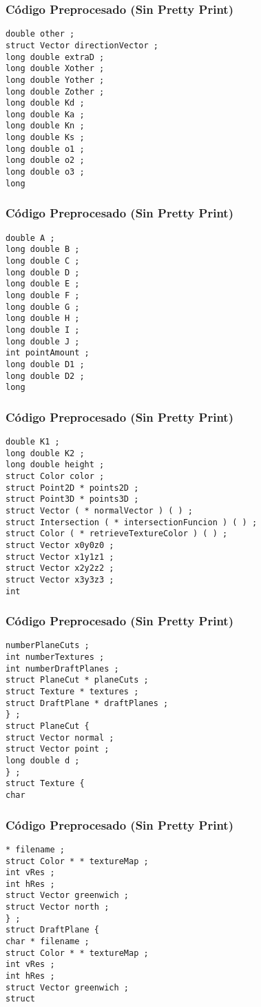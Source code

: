 \documentclass{beamer}
\begin{document}
\begin{frame}[fragile]
\frametitle{C\'odigo Preprocesado (Sin Pretty Print)}
\begin{lstlisting}[style=CStyle]
double other ; 
struct Vector directionVector ; 
long double extraD ; 
long double Xother ; 
long double Yother ; 
long double Zother ; 
long double Kd ; 
long double Ka ; 
long double Kn ; 
long double Ks ; 
long double o1 ; 
long double o2 ; 
long double o3 ; 
long \end{lstlisting}
\end{frame}
\begin{frame}[fragile]
\frametitle{C\'odigo Preprocesado (Sin Pretty Print)}
\begin{lstlisting}[style=CStyle]
double A ; 
long double B ; 
long double C ; 
long double D ; 
long double E ; 
long double F ; 
long double G ; 
long double H ; 
long double I ; 
long double J ; 
int pointAmount ; 
long double D1 ; 
long double D2 ; 
long \end{lstlisting}
\end{frame}
\begin{frame}[fragile]
\frametitle{C\'odigo Preprocesado (Sin Pretty Print)}
\begin{lstlisting}[style=CStyle]
double K1 ; 
long double K2 ; 
long double height ; 
struct Color color ; 
struct Point2D * points2D ; 
struct Point3D * points3D ; 
struct Vector ( * normalVector ) ( ) ; 
struct Intersection ( * intersectionFuncion ) ( ) ; 
struct Color ( * retrieveTextureColor ) ( ) ; 
struct Vector x0y0z0 ; 
struct Vector x1y1z1 ; 
struct Vector x2y2z2 ; 
struct Vector x3y3z3 ; 
int \end{lstlisting}
\end{frame}
\begin{frame}[fragile]
\frametitle{C\'odigo Preprocesado (Sin Pretty Print)}
\begin{lstlisting}[style=CStyle]
numberPlaneCuts ; 
int numberTextures ; 
int numberDraftPlanes ; 
struct PlaneCut * planeCuts ; 
struct Texture * textures ; 
struct DraftPlane * draftPlanes ; 
} ; 
struct PlaneCut { 
struct Vector normal ; 
struct Vector point ; 
long double d ; 
} ; 
struct Texture { 
char \end{lstlisting}
\end{frame}
\begin{frame}[fragile]
\frametitle{C\'odigo Preprocesado (Sin Pretty Print)}
\begin{lstlisting}[style=CStyle]
* filename ; 
struct Color * * textureMap ; 
int vRes ; 
int hRes ; 
struct Vector greenwich ; 
struct Vector north ; 
} ; 
struct DraftPlane { 
char * filename ; 
struct Color * * textureMap ; 
int vRes ; 
int hRes ; 
struct Vector greenwich ; 
struct \end{lstlisting}
\end{frame}
\end{document}

